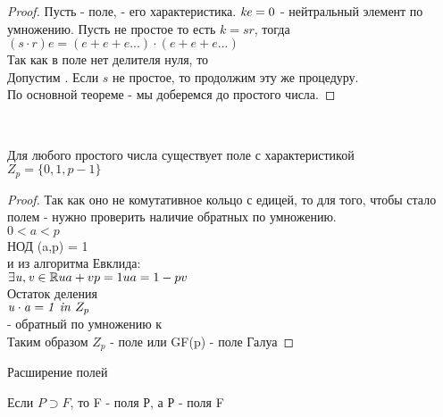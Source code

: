 \begin{theorem}
\end{theorem}

\begin{proof}
	Пусть  - поле,  - его характеристика. $\mathit{ke}=0$  -
	нейтральный элемент по умножению. Пусть  не простое то есть $k = sr$,
	тогда $(s \cdot r)e = (e+e+e...) \cdot (e+e+e...)$ \\
	Так как в поле нет делителя нуля, то  \\
	Допустим . Если $s$ не простое, то продолжим эту же процедуру.\\
	По основной теореме - мы доберемся до простого числа.
\end{proof}

\\

\begin{theorem}
	Для любого простого числа  существует поле с характеристикой  \\
	$Z_{p} = \{0,1, p-1\}$
\end{theorem}

\begin{proof}
	Так как оно не комутативное кольцо с едицей, то для того, чтобы стало полем -
	нужно проверить наличие обратных по умножению. \\
	$0<a<p$ \\
	НОД (a,p) = 1 \\
	и из алгоритма Евклида: \\
	$
	\exists \mathit {u,v} \in \mathbb {R} \\
	ua + vp = 1 \\
	ua = 1 - pv
	$ \\
	Остаток деления  \\
	$\mathit {u \cdot a = 1 ~in~} Z_{p}$ \\
	 - обратный по умножению к  \\
	Таким образом $Z_p$ - поле или GF(p) - поле Галуа
\end{proof}

\begin{title}
	Расширение полей
\end{title}

Если $P \supset F$, то F -  поля Р, а Р -  поля F\\

